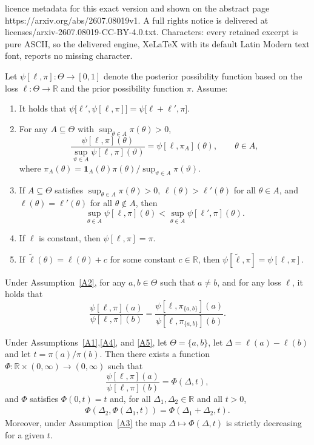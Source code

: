 \documentclass[10pt,a4paper]{amsart}
\begin{document}
licence metadata for this exact version and shown on the abstract page https://arxiv.org/abs/2607.08019v1. A full rights notice is delivered at licenses/arxiv-2607.08019-CC-BY-4.0.txt. Characters: every retained excerpt is pure ASCII, so the delivered engine, XeLaTeX with its default Latin Modern text font, reports no missing character.
\begin{assumptions*}
Let $\psi[\ell,\pi]:\Theta\to[0,1]$ denote the posterior possibility function based on the loss $\ell : \Theta \to \mathbb{R}$ and the prior possibility function $\pi$. Assume:
\begin{enumerate}[label=A2.\arabic*,leftmargin=25pt]
\item\label{A1}
It holds that $\psi\big[\ell', \psi[\ell,\pi]\big] = \psi\big[\ell+\ell', \pi\big]$.
\item\label{A2}
For any $A\subseteq\Theta$ with $\sup_{\theta\in A} \pi(\theta)>0$,
\[
\frac{\psi[\ell,\pi](\theta)}{\sup_{\vartheta \in A}\psi[\ell,\pi](\vartheta)} = \psi[\ell,\pi_A](\theta),\qquad \theta \in A,
\]
where $\pi_A(\theta)=\bm{1}_A(\theta) \pi(\theta)\big/\sup_{\vartheta \in A} \pi(\vartheta)$.
\item\label{A3} If $A\subseteq\Theta$ satisfies $\sup_{\theta\in A}\pi(\theta)>0$, $\ell(\theta) > \ell'(\theta)$ for all $\theta \in A$, and $\ell(\theta) = \ell'(\theta)$ for all
$\theta \notin A$, then
\[
\sup_{\theta\in A}\psi[\ell,\pi](\theta) < \sup_{\theta\in A}\psi[\ell',\pi](\theta).
\]
\item\label{A4}
If $\ell$ is constant, then $\psi[\ell,\pi] = \pi$.
\item\label{A5}
If $\tilde{\ell}(\theta) = \ell(\theta) + c$ for some constant $c\in\mathbb{R}$, then $\psi[\tilde{\ell},\pi] = \psi[\ell,\pi]$.
\end{enumerate}
\end{assumptions*}

\begin{lemma}
\label{lem:pairwise-restrict}
Under Assumption~\ref{A2}, for any $a,b \in \Theta$ such that $a \neq b$, and for any loss $\ell$, it holds that
\[
\frac{\psi[\ell,\pi](a)}{\psi[\ell,\pi](b)} = \frac{\psi[\ell, \pi_{\{a,b\}}](a)}{\psi[\ell, \pi_{\{a,b\}}](b)}.
\]
\end{lemma}

\begin{lemma}
\label{lem:phi-exists}
Under Assumptions~\ref{A1},\ref{A4}, and \ref{A5}, let $\Theta=\{a,b\}$, let $\Delta = \ell(a)-\ell(b)$ and let $t = \pi(a)/\pi(b)$. Then there exists a function $\Phi : \mathbb{R}\times(0,\infty) \to (0,\infty)$ such that
\[
\frac{\psi[\ell,\pi](a)}{\psi[\ell,\pi](b)} = \Phi(\Delta,t),
\]
and $\Phi$ satisfies $\Phi(0,t) = t$ and, for all $\Delta_1, \Delta_2 \in \mathbb{R}$ and all $t > 0$,
\begin{align*}
\Phi(\Delta_2,\Phi(\Delta_1,t)) = \Phi(\Delta_1+\Delta_2,t).
\end{align*}
Moreover, under Assumption~\ref{A3} the map $\Delta \mapsto \Phi(\Delta,t)$ is strictly decreasing for a given $t$.
\end{lemma}
\end{document}
